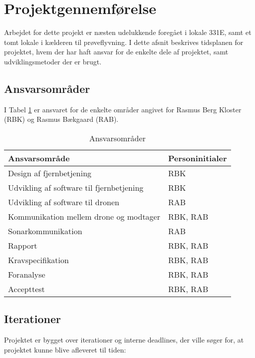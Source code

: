 \documentclass[Main]{subfiles}
\begin{document}
\section{Projektgennemførelse}
Arbejdet for dette projekt er næsten udelukkende foregået i lokale 331E, samt et tomt lokale i kælderen til prøveflyvning.
I dette afsnit beskrives tidsplanen for projektet, hvem der har haft ansvar for de enkelte dele af projektet, samt udviklingsmetoder der er brugt.

\subsection{Ansvarsområder}
I Tabel \ref{Tab:ansvar} er ansvaret for de enkelte områder angivet for Rasmus Berg Kloster (RBK) og Rasmus Bækgaard (RAB).
\begin{table}[H]
\centering
	\begin{tabular}{l l}
	\hline
	\textbf{Ansvarsområde} & \textbf{Personinitialer} \\ \hline
	Design af fjernbetjening & RBK\\
	Udvikling af software til fjernbetjening & RBK\\
	Udvikling af software til dronen & RAB\\
	Kommunikation mellem drone og modtager & RBK, RAB\\
	Sonarkommunikation & RAB\\
	Rapport & RBK, RAB\\
	Kravspecifikation & RBK, RAB\\
	Foranalyse & RBK, RAB\\
	Accepttest & RBK, RAB
	\\ \hline
	\end{tabular}
\caption{Ansvarsområder}
\label{Tab:ansvar}
\end{table}


\subsection{Iterationer}
Projektet er bygget over iterationer og interne deadlines, der ville søger for, at projektet kunne blive afleveret til tiden:
\end{document}
